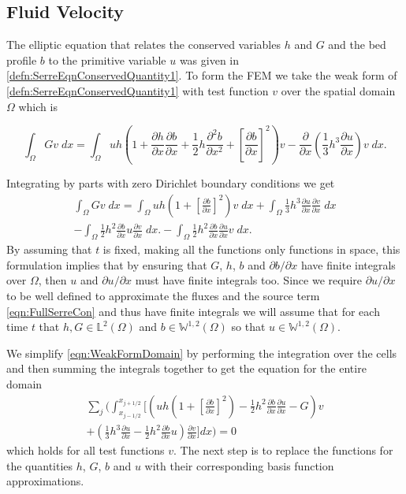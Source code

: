 \subsection{Fluid Velocity}
\label{subsec:FluidVelocity}
The elliptic equation that relates the conserved variables $h$ and $G$ and the bed profile $b$ to the primitive variable $u$ was given in \eqref{defn:SerreEqnConservedQuantity1}. To form the FEM we take the weak form of \eqref{defn:SerreEqnConservedQuantity1} with test function $v$ over the spatial domain $\Omega$ which is 

\begin{equation*}
	\int_{\Omega } G v \; dx =  \int_{\Omega } uh \left(1 + \frac{\partial h}{\partial x}\frac{\partial b}{\partial x} + \frac{1}{2}h\frac{\partial^2 b}{\partial x^2} +  \left[\frac{\partial b}{\partial x}\right]^2 \right) v - \frac{\partial}{\partial x}\left(\frac{1}{3}h^3  \frac{\partial {u}}{\partial x}\right) v \; dx.
\end{equation*}

Integrating by parts with zero Dirichlet boundary conditions we get
\begin{multline}
\int_{\Omega } G v \; dx = \int_{\Omega } uh \left(1 + \left[\frac{\partial b}{\partial x}\right]^2 \right) v \; dx +  \int_{\Omega } \frac{1}{3}h^3  \frac{\partial {u}}{\partial x} \frac{\partial v}{\partial x} \; dx  \\ - 
\int_{\Omega }   \frac{1}{2}h^2\frac{\partial b}{\partial x} u \frac{\partial v }{\partial x}\; dx. - 
\int_{\Omega }   \frac{1}{2}h^2\frac{\partial b}{\partial x}  \frac{\partial u }{\partial x}v \; dx.
\label{eqn:WeakFormDomain}
\end{multline}
By assuming that $t$ is fixed, making all the functions only functions in space, this formulation implies that by ensuring that $G$, $h$, $b$ and $\partial b / \partial x$ have finite integrals over $\Omega$, then $u$ and $\partial u / \partial x$ must have finite integrals too. Since we require $\partial u / \partial x$ to be well defined to approximate the fluxes and the source term \eqref{eqn:FullSerreCon} and thus have finite integrals we will assume that for each time $t$ that $h,G \in \mathbb{L}^2(\Omega)$ and $b \in\mathbb{W}^{1,2}(\Omega)$ so that $u \in \mathbb{W}^{1,2}(\Omega)$. 

We simplify \eqref{eqn:WeakFormDomain} by performing the integration over the cells and then summing the integrals together to get the equation for the entire domain
\begin{multline}
\label{eq:elementwiseint}
 \sum_{j} \Bigg(  \int_{x_{j-1/2} }^{{x_{j+1/2}}} \Bigg[  \left( uh \left(1 + \left[\frac{\partial b}{\partial x}\right]^2 \right)  - \frac{1}{2}h^2\frac{\partial b}{\partial x}  \frac{\partial u }{\partial x}  -  G \right) v   \\ +  \left(\frac{1}{3}h^3  \frac{\partial {u}}{\partial x}    -     \frac{1}{2}h^2\frac{\partial b}{\partial x} u    \right) \frac{\partial v }{\partial x} \Bigg]dx \Bigg)  = 0
\end{multline}
which holds for all test functions $v$. The next step is to replace the functions for the quantities $h$, $G$, $b$ and $u$ with their corresponding basis function approximations. 

